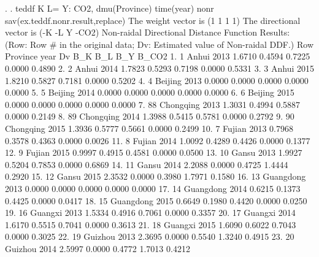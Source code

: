 . 
. teddf K L= Y: CO2, dmu(Province) time(year) nonr sav(ex.teddf.nonr.result,replace)
{\smallskip}
 The weight vector is (1 1 1 1)
{\smallskip}
 The directional vector is (-K -L Y -CO2)
{\smallskip}
{\smallskip}
 Non-raidal Directional Distance Function Results:
    (Row: Row \# in the original data; Dv: Estimated value of Non-raidal DDF.)
{\smallskip}
     {\TLC}
     {\VBAR} Row       Province   year       Dv      B_K      B_L      B_Y    B_CO2 {\VBAR}
     {\LFTT}
  1. {\VBAR}   1          Anhui   2013   1.6710   0.4594   0.7225   0.0000   0.4890 {\VBAR}
  2. {\VBAR}   2          Anhui   2014   1.7823   0.5293   0.7198   0.0000   0.5331 {\VBAR}
  3. {\VBAR}   3          Anhui   2015   1.8210   0.5827   0.7181   0.0000   0.5202 {\VBAR}
  4. {\VBAR}   4        Beijing   2013   0.0000   0.0000   0.0000   0.0000   0.0000 {\VBAR}
  5. {\VBAR}   5        Beijing   2014   0.0000   0.0000   0.0000   0.0000   0.0000 {\VBAR}
  6. {\VBAR}   6        Beijing   2015   0.0000   0.0000   0.0000   0.0000   0.0000 {\VBAR}
  7. {\VBAR}  88      Chongqing   2013   1.3031   0.4994   0.5887   0.0000   0.2149 {\VBAR}
  8. {\VBAR}  89      Chongqing   2014   1.3988   0.5415   0.5781   0.0000   0.2792 {\VBAR}
  9. {\VBAR}  90      Chongqing   2015   1.3936   0.5777   0.5661   0.0000   0.2499 {\VBAR}
 10. {\VBAR}   7         Fujian   2013   0.7968   0.3578   0.4363   0.0000   0.0026 {\VBAR}
 11. {\VBAR}   8         Fujian   2014   1.0092   0.4289   0.4426   0.0000   0.1377 {\VBAR}
 12. {\VBAR}   9         Fujian   2015   0.9997   0.4915   0.4581   0.0000   0.0500 {\VBAR}
 13. {\VBAR}  10          Gansu   2013   1.9927   0.5204   0.7853   0.0000   0.6869 {\VBAR}
 14. {\VBAR}  11          Gansu   2014   2.2088   0.0000   0.4725   1.4444   0.2920 {\VBAR}
 15. {\VBAR}  12          Gansu   2015   2.3532   0.0000   0.3980   1.7971   0.1580 {\VBAR}
 16. {\VBAR}  13      Guangdong   2013   0.0000   0.0000   0.0000   0.0000   0.0000 {\VBAR}
 17. {\VBAR}  14      Guangdong   2014   0.6215   0.1373   0.4425   0.0000   0.0417 {\VBAR}
 18. {\VBAR}  15      Guangdong   2015   0.6649   0.1980   0.4420   0.0000   0.0250 {\VBAR}
 19. {\VBAR}  16        Guangxi   2013   1.5334   0.4916   0.7061   0.0000   0.3357 {\VBAR}
 20. {\VBAR}  17        Guangxi   2014   1.6170   0.5515   0.7041   0.0000   0.3613 {\VBAR}
 21. {\VBAR}  18        Guangxi   2015   1.6090   0.6022   0.7043   0.0000   0.3025 {\VBAR}
 22. {\VBAR}  19        Guizhou   2013   2.3695   0.0000   0.5540   1.3240   0.4915 {\VBAR}
 23. {\VBAR}  20        Guizhou   2014   2.5997   0.0000   0.4772   1.7013   0.4212 {\VBAR}
